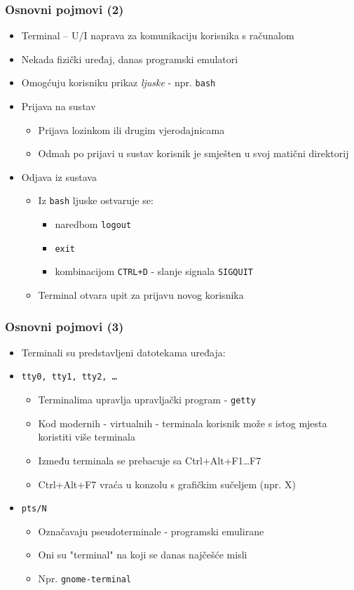 \documentclass[table,usenames,dvipsnames] {beamer}
\newcommand{\shell}[1]{\texttt{#1}}
\begin{document}
\begin{frame}[t]
\frametitle{Osnovni pojmovi (2)}
\begin{itemize}
	\item Terminal -- U/I naprava za komunikaciju korisnika s računalom
	\item Nekada fizički uređaj, danas programski emulatori
	\item Omogćuju korisniku prikaz \textit{ljuske} - npr. \shell{bash}
  \item Prijava na sustav
  \begin{itemize}
  	\item Prijava lozinkom ili drugim vjerodajnicama
  	\item Odmah po prijavi u sustav korisnik je smješten u svoj matični direktorij
  \end{itemize}
  \item Odjava iz sustava
  \begin{itemize}
  	\item Iz \shell{bash} ljuske ostvaruje se:
    \begin{itemize}
      \item naredbom \shell{logout}
      \item \shell{exit} 
      \item kombinacijom \shell{CTRL+D} - slanje signala \shell{SIGQUIT}
    \end{itemize}
  	\item Terminal otvara upit za prijavu novog korisnika
  \end{itemize}
\end{itemize}
\end{frame}

\begin{frame}[t]
\frametitle{Osnovni pojmovi (3)}
  \begin{itemize}
  	\item Terminali su predstavljeni datotekama uređaja:
    \item[] \shell{tty0, tty1, tty2, \ldots}
    \begin{itemize}
    	\item Terminalima upravlja upravljački program - \shell{getty}
    	\item Kod modernih - virtualnih - terminala korisnik može s istog mjesta koristiti više terminala
	  \item Između terminala se prebacuje sa Ctrl+Alt+F1\ldots F7
    \item Ctrl+Alt+F7 vraća u konzolu s grafičkim sučeljem (npr. X)
    \end{itemize}
    \item[] \shell{pts/N}
    \begin{itemize}
      \item Označavaju pseudoterminale - programski emulirane
      \item Oni su "terminal" na koji se danas najčešće misli
      \item[] Npr. \shell{gnome-terminal}
    \end{itemize}
  \end{itemize}
\end{frame}
\end{document}
